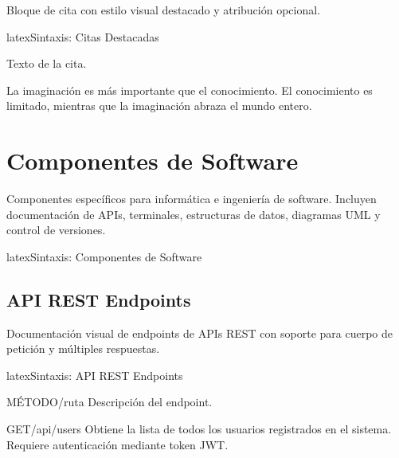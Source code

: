 Bloque de cita con estilo visual destacado y atribución opcional.

\begin{codigosimple}{latex}{Sintaxis: Citas Destacadas}
\begin{quotebox}[Autor]
  Texto de la cita.
\end{quotebox}
\end{codigosimple}

\begin{quotebox}
  La imaginación es más importante que el conocimiento. El conocimiento
  es limitado, mientras que la imaginación abraza el mundo entero.
\end{quotebox}


\section{Componentes de Software}
\label{sec:comp-software}

Componentes específicos para informática e ingeniería de software. Incluyen
documentación de APIs, terminales, estructuras de datos, diagramas UML y
control de versiones.

\begin{codigosimple}{latex}{Sintaxis: Componentes de Software}
\usepackage[software]{eps-componentes}
\end{codigosimple}

\subsection{API REST Endpoints}
\label{subsec:api}

Documentación visual de endpoints de APIs REST con soporte para cuerpo de
petición y múltiples respuestas.

\begin{codigosimple}{latex}{Sintaxis: API REST Endpoints}
\begin{apiendpoint}{MÉTODO}{/ruta}
  Descripción del endpoint.

\end{apiendpoint}
\end{codigosimple}

\begin{apiendpoint}{GET}{/api/users}
  Obtiene la lista de todos los usuarios registrados en el sistema.
  Requiere autenticación mediante token JWT.



\end{apiendpoint}


